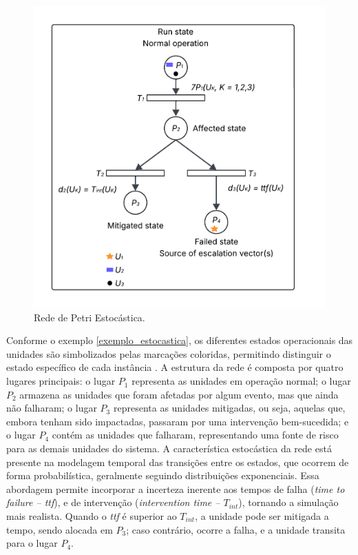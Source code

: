 \documentclass[
	12pt,				%
	openright,			%
	oneside,			%
	a4paper,			%
	english,			%
	brazil				%
	]{abntex2}
\begin{document}
\begin{figure}[ht] 
	\centering
	\includegraphics[scale=0.2]{figuras/rede_petri_estocastica.png}
	\caption[Rede de Petri Estocástica]{Rede de Petri Estocástica. \cite{inproceedings}}
	\label{fig:rede_petri_estocastica}
\end{figure}
\FloatBarrier

Conforme o exemplo \ref{exemplo_estocastica}, os diferentes estados operacionais das unidades são simbolizados pelas marcações coloridas, permitindo distinguir o estado específico de cada instância \cite{inproceedings}. A estrutura da rede é composta por quatro lugares principais: o lugar $P_{1}$ representa as unidades em operação normal; o lugar $P_{2}$ armazena as unidades que foram afetadas por algum evento, mas que ainda não falharam; o lugar $P_{3}$ representa as unidades mitigadas, ou seja, aquelas que, embora tenham sido impactadas, passaram por uma intervenção bem-sucedida; e o lugar $P_4$ contém as unidades que falharam, representando uma fonte de risco para as demais unidades do sistema. A característica estocástica da rede está presente na modelagem temporal das transições entre os estados, que ocorrem de forma probabilística, geralmente seguindo distribuições exponenciais. Essa abordagem permite incorporar a incerteza inerente aos tempos de falha (\textit{time to failure – ttf}), e de intervenção (\textit{intervention time – $T_{int}$}), tornando a simulação mais realista. Quando o \textit{ttf} é superior ao \textit{$T_{int}$}, a unidade pode ser mitigada a tempo, sendo alocada em $P_{3}$; caso contrário, ocorre a falha, e a unidade transita para o lugar $P_{4}$.
\end{document}
